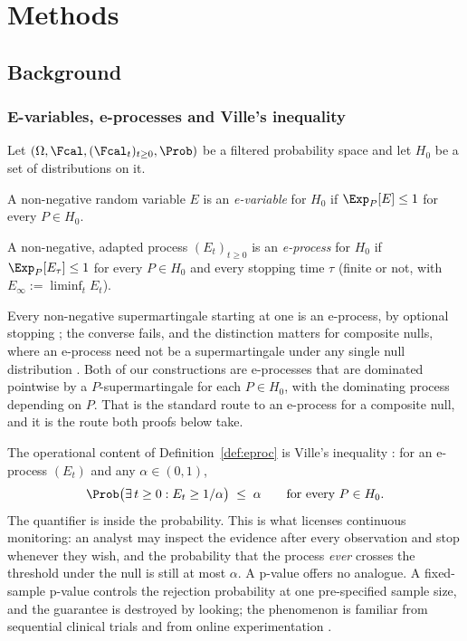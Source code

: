 \section{Methods}\label{sec:methods}

\subsection{Background}\label{sec:background}

\subsubsection{E-variables, e-processes and Ville's inequality}
\label{sec:eproc}

Let $(\Omega, \Fcal, (\Fcal_t)_{t \ge 0}, \Prob)$ be a filtered probability
space and let $H_0$ be a set of distributions on it.

\begin{definition}[E-variable]\label{def:evar}
A non-negative random variable $E$ is an \emph{e-variable} for $H_0$ if
$\Exp_P[E] \le 1$ for every $P \in H_0$.
\end{definition}

\begin{definition}[E-process]\label{def:eproc}
A non-negative, adapted process $(E_t)_{t \ge 0}$ is an \emph{e-process} for
$H_0$ if $\Exp_P[E_\tau] \le 1$ for every $P \in H_0$ and every stopping time
$\tau$ (finite or not, with $E_\infty := \liminf_t E_t$).
\end{definition}

Every non-negative supermartingale starting at one is an e-process, by
optional stopping \citep{shafer2019game}; the converse fails, and the distinction matters for
composite nulls, where an e-process need not be a supermartingale under any
single null distribution \citep{ramdas2023gametheoretic}. Both of our
constructions are e-processes that are dominated pointwise by a
$P$-supermartingale for each $P \in H_0$, with the dominating process
depending on $P$. That is the standard route to an e-process for a composite
null, and it is the route both proofs below take.

The operational content of Definition~\ref{def:eproc} is Ville's inequality
\citep{ville1939etude}: for an e-process $(E_t)$ and any $\alpha \in (0,1)$,
\begin{equation}\label{eq:ville}
\Prob\bigl( \exists\, t \ge 0 : E_t \ge 1/\alpha \bigr) \;\le\; \alpha
\qquad \text{for every } P \in H_0 .
\end{equation}
The quantifier is inside the probability. This is what licenses continuous
monitoring: an analyst may inspect the evidence after every observation and
stop whenever they wish, and the probability that the process \emph{ever}
crosses the threshold under the null is still at most $\alpha$. A p-value
offers no analogue. A fixed-sample p-value controls the rejection probability
at one pre-specified sample size, and the guarantee is destroyed by looking;
the phenomenon is familiar from sequential clinical trials and from online
experimentation \citep{johari2022always}.

